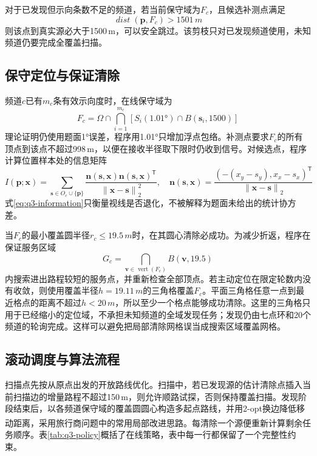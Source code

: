 \documentclass[UTF8,12pt,a4paper]{ctexart}
\newcommand{\vect}[1]{\boldsymbol{#1}}
\numberwithin{equation}{section}
\begin{document}
对于已发现但示向条数不足的频道，若当前保守域为$F_c$，且候选补测点满足
\begin{equation}
\mathop{\mathit{dist}}(\vect{p},F_c)>1501\,m
\label{eq:q3-safe-skip}
\end{equation}
则该点到真实源必大于1500\,m，可以安全跳过。该剪枝只对已发现频道使用，未知频道仍要完成全覆盖扫描。

\subsection{保守定位与保证清除}

频道$c$已有$m_c$条有效示向度时，在线保守域为
\begin{equation}
F_c=\Omega\cap\bigcap_{i=1}^{m_c}\left[S_i(1.01°)\cap B(\vect{s}_i,1500)\right]
\label{eq:q3-online-domain}
\end{equation}
理论证明仍使用题面1°误差，程序用1.01°只增加浮点包络。补测点要求$F_c$的所有顶点到该点不超过998\,m，以便在接收半径取下限时仍收到信号。对候选点，程序计算位置样本处的信息矩阵
\begin{equation}
I(\vect{p};\vect{x})=\sum_{\vect{s}\in O_c\cup\{\vect{p}\}}\frac{\vect{n}(\vect{s},\vect{x})\vect{n}(\vect{s},\vect{x})^{\mathsf T}}{\left\|\vect{x}-\vect{s}\right\|_2^2},\quad
\vect{n}(\vect{s},\vect{x})=\frac{(-(x_y-s_y),x_x-s_x)^{\mathsf T}}{\left\|\vect{x}-\vect{s}\right\|_2}
\label{eq:q3-information}
\end{equation}
式\eqref{eq:q3-information}只衡量视线是否退化，不被解释为题面未给出的统计协方差。

当$F_c$的最小覆盖圆半径$r_c\leq19.5\,m$时，在其圆心清除必成功。为减少折返，程序在保证服务区域
\begin{equation}
G_c=\bigcap_{\vect{v}\in\operatorname{vert}(F_c)}B(\vect{v},19.5)
\label{eq:q3-service}
\end{equation}
内搜索进出路程较短的服务点，并重新检查全部顶点。若主动定位在限定轮数内没有收敛，则使用覆盖半径$h=19.11\,m$的三角格覆盖$F_c$。平面三角格任意一点到最近格点的距离不超过$h<20\,m$，所以至少一个格点能够成功清除。这里的三角格只用于已经缩小的定位域，不承担未知频道的全域发现任务；发现仍由七点环和20个频道的轮询完成。这样可以避免把局部清除网格误当成搜索区域覆盖网格。

\subsection{滚动调度与算法流程}

扫描点先按从原点出发的开放路线优化。扫描中，若已发现源的估计清除点插入当前扫描边的增量路程不超过150\,m，则允许顺路试探，否则保持覆盖扫描。发现阶段结束后，以各频道保守域的覆盖圆圆心构造多起点路线，并用2-opt换边降低移动距离，采用旅行商问题中的常用局部改进思路\textsuperscript{\normalfont\cite{croes,lin}}。每清除一个源便重新计算剩余任务顺序。表\ref{tab:q3-policy}概括了在线策略，表中每一行都保留了一个完整性约束。
\end{document}
